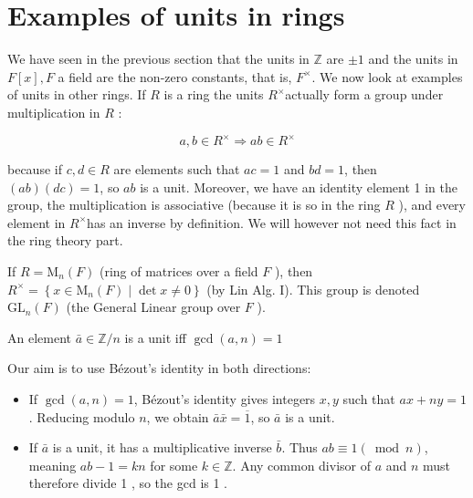 
\section{Examples of units in rings}

We have seen in the previous section that the units in \(\mathbb{Z}\) are \(\pm 1\) and the units in \(F[x], F\) a field are the non-zero constants, that is, \(F^{\times}\). We now look at examples of units in other rings. If \(R\) is a ring the units \(R^{\times}\)actually form a group under multiplication in \(R\) :

\[
a, b \in R^{\times} \Longrightarrow a b \in R^{\times}
\]

because if \(c, d \in R\) are elements such that \(a c=1\) and \(b d=1\), then \((a b)(d c)=1\), so \(a b\) is a unit. Moreover, we have an identity element 1 in the group, the multiplication is associative (because it is so in the ring \(R\) ), and every element in \(R^{\times}\)has an inverse by definition. We will however not need this fact in the ring theory part.

\begin{example}

If \(R=\mathrm{M}_n(F)\) (ring of matrices over a field \(F\) ), then \(R^{\times}=\left\{x \in \mathrm{M}_n(F) \mid \operatorname{det} x \neq 0\right\}\) (by Lin Alg. I). This group is denoted \(\mathrm{GL}_n(F)\) (the General Linear group over \(F\) ).

\end{example}

\begin{proposition}
  An element \(\bar{a} \in \mathbb{Z} / n\) is a unit iff \(\operatorname{gcd}(a, n)=1\)
\end{proposition}

\begin{proofidea}
  
 Our aim is to use Bézout's identity in both directions:

 \begin{itemize}
 \item[\(\Leftarrow\)] If \(\operatorname{gcd}(a, n)=1\), Bézout's identity gives integers \(x, y\) such that \(a x+n y=1\). Reducing modulo \(n\), we obtain \(\bar{a} \bar{x}=\overline{1}\), so \(\bar{a}\) is a unit. 
 \item[\(\Rightarrow\)] If \(\bar{a}\) is a unit, it has a multiplicative inverse \(\bar{b}\). Thus \(a b \equiv 1(\bmod n)\), meaning \(a b-1=k n\) for some \(k \in \mathbb{Z}\). Any common divisor of \(a\) and \(n\) must therefore divide 1 , so the gcd is 1 .
 \end{itemize}

\end{proofidea}
  
